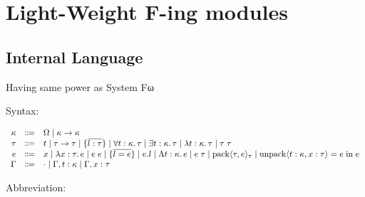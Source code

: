 \section{Light-Weight F-ing modules}

\cite{Rossberg:2014}

\subsection{Internal Language}

Having same power as System Fω

Syntax:

\begin{align*}
  \begin{array}{rcl}
  \kappa
  & \Coloneq & \Omega \mid \kappa \to \kappa
  \\
  \tau
  & \Coloneq & t
  \mid \tau \to \tau
  \mid \{\overline{l: \tau}\}
  \mid \forall t: \kappa\ldotp \tau
  \mid \exists t: \kappa\ldotp \tau
  \mid \lambda t: \kappa\ldotp \tau
  \mid \tau\; \tau
  \\
  e
  & \Coloneq & x
  \mid \lambda x: \tau\ldotp e
  \mid e\; e
  \mid \{\overline{l = e}\}
  \mid e . l
  \mid \Lambda t: \kappa\ldotp e
  \mid e\; \tau
  \mid \sympack \langle \tau, e\rangle_\tau
  \mid \symunpack \langle t: \kappa, x: \tau\rangle = e \symin e
  \\
  \Gamma
  & \Coloneq & \cdot
  \mid \Gamma, t: \kappa
  \mid \Gamma, x: \tau
  \end{array}
\end{align*}

Abbreviation:

